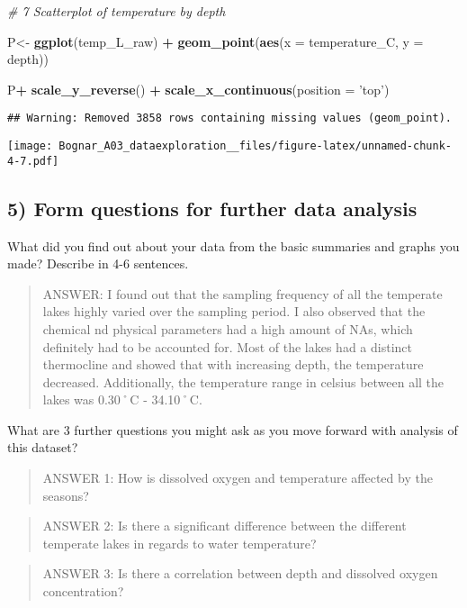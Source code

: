 \documentclass[]{article}
\newenvironment{Shaded}{\begin{snugshade}}{\end{snugshade}}
\newcommand{\KeywordTok}[1]{\textcolor[rgb]{0.13,0.29,0.53}{\textbf{#1}}}
\newcommand{\DataTypeTok}[1]{\textcolor[rgb]{0.13,0.29,0.53}{#1}}
\newcommand{\StringTok}[1]{\textcolor[rgb]{0.31,0.60,0.02}{#1}}
\newcommand{\CommentTok}[1]{\textcolor[rgb]{0.56,0.35,0.01}{\textit{#1}}}
\newcommand{\OperatorTok}[1]{\textcolor[rgb]{0.81,0.36,0.00}{\textbf{#1}}}
\newcommand{\NormalTok}[1]{#1}
\begin{document}
\begin{Shaded}
\begin{Highlighting}[]
\CommentTok{# 7 Scatterplot of temperature by depth}

\NormalTok{P<-}\StringTok{ }\KeywordTok{ggplot}\NormalTok{(temp_L_raw) }\OperatorTok{+}
\StringTok{  }\KeywordTok{geom_point}\NormalTok{(}\KeywordTok{aes}\NormalTok{(}\DataTypeTok{x =}\NormalTok{ temperature_C, }\DataTypeTok{y =}\NormalTok{ depth))}

\NormalTok{P}\OperatorTok{+}\StringTok{ }\KeywordTok{scale_y_reverse}\NormalTok{() }\OperatorTok{+}\StringTok{ }\KeywordTok{scale_x_continuous}\NormalTok{(}\DataTypeTok{position =} \StringTok{'top'}\NormalTok{)}
\end{Highlighting}
\end{Shaded}

\begin{verbatim}
## Warning: Removed 3858 rows containing missing values (geom_point).
\end{verbatim}

\texttt{[image: Bognar\_A03\_dataexploration\_\_files/figure-latex/unnamed-chunk-4-7.pdf]}

\subsection{5) Form questions for further data
analysis}\label{form-questions-for-further-data-analysis}

What did you find out about your data from the basic summaries and
graphs you made? Describe in 4-6 sentences.

\begin{quote}
ANSWER: I found out that the sampling frequency of all the temperate
lakes highly varied over the sampling period. I also observed that the
chemical nd physical parameters had a high amount of NAs, which
definitely had to be accounted for. Most of the lakes had a distinct
thermocline and showed that with increasing depth, the temperature
decreased. Additionally, the temperature range in celsius between all
the lakes was 0.30˚C - 34.10˚C.
\end{quote}

What are 3 further questions you might ask as you move forward with
analysis of this dataset?

\begin{quote}
ANSWER 1: How is dissolved oxygen and temperature affected by the
seasons?
\end{quote}

\begin{quote}
ANSWER 2: Is there a significant difference between the different
temperate lakes in regards to water temperature?
\end{quote}

\begin{quote}
ANSWER 3: Is there a correlation between depth and dissolved oxygen
concentration?
\end{quote}
\end{document}
